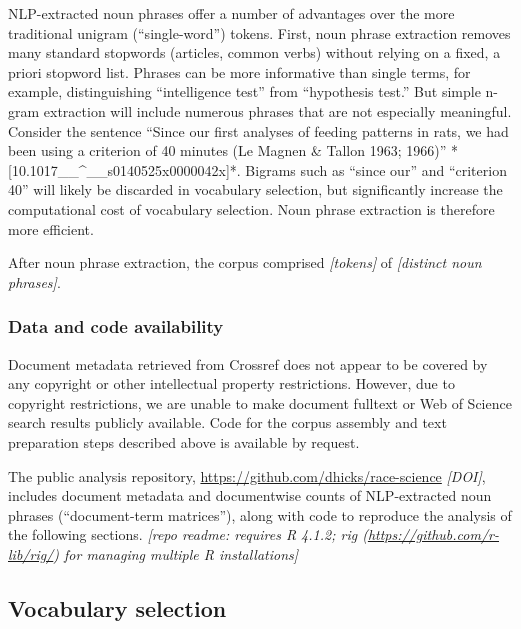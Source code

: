 \documentclass[12pt]{article}
\begin{document}
NLP-extracted noun phrases offer a number of advantages over the more traditional unigram (``single-word'') tokens. First, noun phrase extraction removes many standard stopwords (articles, common verbs) without relying on a fixed, a priori stopword list. Phrases can be more informative than single terms, for example, distinguishing ``intelligence test'' from ``hypothesis test.'' But simple n-gram extraction will include numerous phrases that are not especially meaningful. Consider the sentence ``Since our first analyses of feeding patterns in rats, we had been using a criterion of 40 minutes (Le Magnen \& Tallon 1963; 1966)'' *{[}10.1017\_\_\^{}\_\_s0140525x0000042x{]}*. Bigrams such as ``since our'' and ``criterion 40'' will likely be discarded in vocabulary selection, but significantly increase the computational cost of vocabulary selection. Noun phrase extraction is therefore more efficient.

After noun phrase extraction, the corpus comprised \emph{{[}tokens{]}} of \emph{{[}distinct noun phrases{]}}.

\hypertarget{data-and-code-availability}{%
\subsubsection*{Data and code availability}\label{data-and-code-availability}}

Document metadata retrieved from Crossref does not appear to be covered by any copyright or other intellectual property restrictions. However, due to copyright restrictions, we are unable to make document fulltext or Web of Science search results publicly available. Code for the corpus assembly and text preparation steps described above is available by request.

The public analysis repository, \url{https://github.com/dhicks/race-science} \emph{{[}DOI{]}}, includes document metadata and documentwise counts of NLP-extracted noun phrases (``document-term matrices''), along with code to reproduce the analysis of the following sections. \emph{{[}repo readme: requires R 4.1.2; rig (\url{https://github.com/r-lib/rig/}) for managing multiple R installations{]}}

\hypertarget{vocabulary-selection}{%
\subsection*{Vocabulary selection}\label{vocabulary-selection}}
\end{document}
